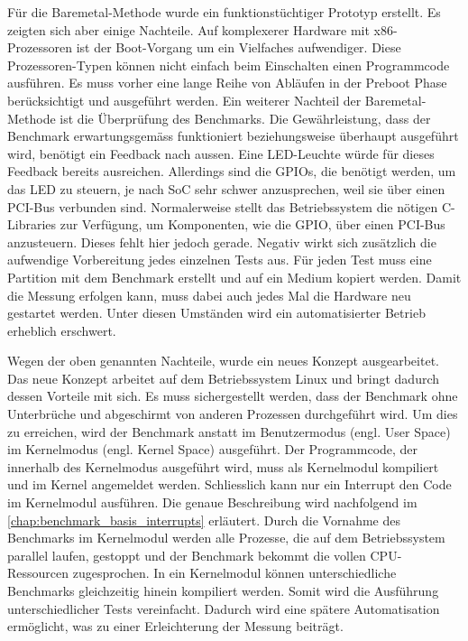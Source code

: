 Für die Baremetal-Methode wurde ein funktionstüchtiger Prototyp erstellt. Es zeigten sich aber einige Nachteile. Auf komplexerer Hardware mit x86-Prozessoren ist der Boot-Vorgang um ein Vielfaches aufwendiger\cite{intel_boot_process}. Diese Prozessoren-Typen können nicht einfach beim Einschalten einen Programmcode ausführen. Es muss vorher eine lange Reihe von Abläufen in der Preboot Phase berücksichtigt und ausgeführt werden. Ein weiterer Nachteil der Baremetal-Methode ist die Überprüfung des Benchmarks. Die Gewährleistung, dass der Benchmark erwartungsgemäss funktioniert beziehungsweise überhaupt ausgeführt wird, benötigt ein Feedback nach aussen. Eine LED-Leuchte würde für dieses Feedback bereits ausreichen. Allerdings sind die GPIOs, die benötigt werden, um das LED zu steuern, je nach SoC sehr schwer anzusprechen, weil sie über einen PCI-Bus verbunden sind. Normalerweise stellt das Betriebssystem die nötigen C-Libraries zur Verfügung, um Komponenten, wie die GPIO, über einen PCI-Bus anzusteuern. Dieses fehlt hier jedoch gerade. Negativ wirkt sich zusätzlich die aufwendige Vorbereitung jedes einzelnen Tests aus. Für jeden Test muss eine Partition mit dem Benchmark erstellt und auf ein Medium kopiert werden. Damit die Messung erfolgen kann, muss dabei auch jedes Mal die Hardware neu gestartet werden. Unter diesen Umständen wird ein automatisierter Betrieb erheblich erschwert.
\par
Wegen der oben genannten Nachteile, wurde ein neues Konzept ausgearbeitet. Das neue Konzept arbeitet auf dem Betriebssystem Linux und bringt dadurch dessen Vorteile mit sich. Es muss sichergestellt werden, dass der Benchmark ohne Unterbrüche und abgeschirmt von anderen Prozessen durchgeführt wird. Um dies zu erreichen, wird der Benchmark anstatt im Benutzermodus (engl. User Space) im Kernelmodus (engl. Kernel Space) ausgeführt\cite{Mandl2010}. Der Programmcode, der innerhalb des Kernelmodus ausgeführt wird, muss als Kernelmodul kompiliert und im Kernel angemeldet werden. Schliesslich kann nur ein Interrupt den Code im Kernelmodul ausführen. Die genaue Beschreibung wird nachfolgend im \autoref{chap:benchmark_basis_interrupts} erläutert. Durch die Vornahme des Benchmarks im Kernelmodul werden alle Prozesse, die auf dem Betriebssystem parallel laufen, gestoppt und der Benchmark bekommt die vollen CPU-Ressourcen zugesprochen. In ein Kernelmodul können unterschiedliche Benchmarks gleichzeitig hinein kompiliert werden. Somit wird die Ausführung unterschiedlicher Tests vereinfacht. Dadurch wird eine spätere Automatisation ermöglicht, was zu einer Erleichterung der Messung beiträgt. 

 



 
